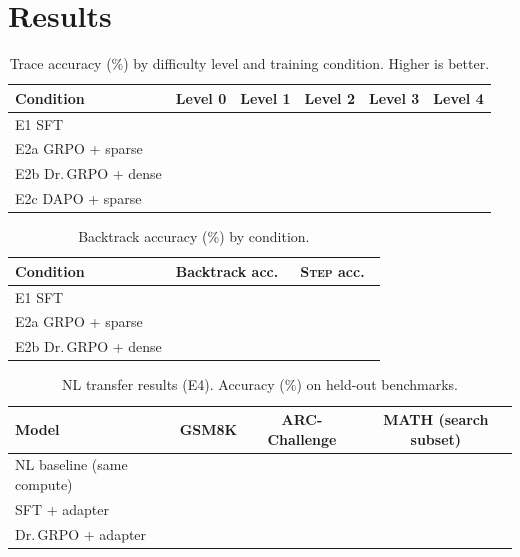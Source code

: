 \section{Results}
\label{sec:results}


\begin{table}[h]
  \centering
  \caption{Trace accuracy (\%) by difficulty level and training condition.
           Higher is better.}
  \label{tab:main-results}
  \begin{tabular}{lccccc}
    \toprule
    Condition & Level 0 & Level 1 & Level 2 & Level 3 & Level 4 \\
    \midrule
    E1 SFT                     & \todo{} & \todo{} & \todo{} & \todo{} & \todo{} \\
    E2a GRPO + sparse          & \todo{} & \todo{} & \todo{} & \todo{} & \todo{} \\
    E2b Dr.\,GRPO + dense      & \todo{} & \todo{} & \todo{} & \todo{} & \todo{} \\
    E2c DAPO + sparse          & \todo{} & \todo{} & \todo{} & \todo{} & \todo{} \\
    \bottomrule
  \end{tabular}
\end{table}

\begin{table}[h]
  \centering
  \caption{Backtrack accuracy (\%) by condition.}
  \label{tab:backtrack-accuracy}
  \begin{tabular}{lcc}
    \toprule
    Condition & Backtrack acc.\ & \textsc{Step} acc.\ \\
    \midrule
    E1 SFT                & \todo{} & \todo{} \\
    E2a GRPO + sparse     & \todo{} & \todo{} \\
    E2b Dr.\,GRPO + dense & \todo{} & \todo{} \\
    \bottomrule
  \end{tabular}
\end{table}

\begin{table}[h]
  \centering
  \caption{NL transfer results (E4). Accuracy (\%) on held-out benchmarks.}
  \label{tab:nl-transfer}
  \begin{tabular}{lccc}
    \toprule
    Model & GSM8K & ARC-Challenge & MATH (search subset) \\
    \midrule
    NL baseline (same compute)   & \todo{} & \todo{} & \todo{} \\
    \gore{} SFT + adapter        & \todo{} & \todo{} & \todo{} \\
    \gore{} Dr.\,GRPO + adapter  & \todo{} & \todo{} & \todo{} \\
    \bottomrule
  \end{tabular}
\end{table}


